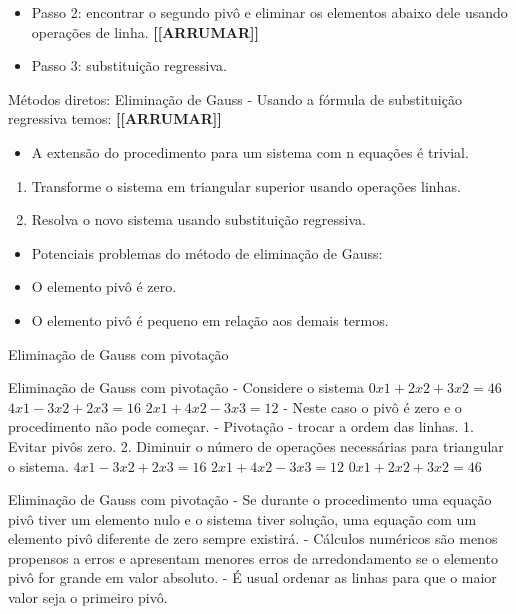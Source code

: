 \documentclass[
]{article}
\providecommand{\tightlist}{%
  \setlength{\itemsep}{0pt}\setlength{\parskip}{0pt}}
\begin{document}
\begin{itemize}
\item
  Passo 2: encontrar o segundo pivô e eliminar os elementos abaixo dele
  usando operações de linha. \textbf{{[}{[}ARRUMAR{]}{]}}
\item
  Passo 3: substituição regressiva.
\end{itemize}

Métodos diretos: Eliminação de Gauss - Usando a fórmula de substituição
regressiva temos: \textbf{{[}{[}ARRUMAR{]}{]}}

\begin{itemize}
\tightlist
\item
  A extensão do procedimento para um sistema com n equações é trivial.
\end{itemize}

\begin{enumerate}
\def\labelenumi{\arabic{enumi}.}
\tightlist
\item
  Transforme o sistema em triangular superior usando operações linhas.
\item
  Resolva o novo sistema usando substituição regressiva.
\end{enumerate}

\begin{itemize}
\tightlist
\item
  Potenciais problemas do método de eliminação de Gauss:
\item
  O elemento pivô é zero.
\item
  O elemento pivô é pequeno em relação aos demais termos.
\end{itemize}

Eliminação de Gauss com pivotação

Eliminação de Gauss com pivotação - Considere o sistema
\(0x 1 + 2x 2 + 3x 2 = 46\) \(4x 1 - 3x 2 + 2x 3 = 16\)
\(2x 1 + 4x 2 - 3x 3 = 12\) - Neste caso o pivô é zero e o procedimento
não pode começar. - Pivotação - trocar a ordem das linhas. 1. Evitar
pivôs zero. 2. Diminuir o número de operações necessárias para
triangular o sistema. \(4x 1 - 3x 2 + 2x 3 = 16\)
\(2x 1 + 4x 2 - 3x 3 = 12\) \(0x 1 + 2x 2 + 3x 2 = 46\)

Eliminação de Gauss com pivotação - Se durante o procedimento uma
equação pivô tiver um elemento nulo e o sistema tiver solução, uma
equação com um elemento pivô diferente de zero sempre existirá. -
Cálculos numéricos são menos propensos a erros e apresentam menores
erros de arredondamento se o elemento pivô for grande em valor absoluto.
- É usual ordenar as linhas para que o maior valor seja o primeiro pivô.
\end{document}
